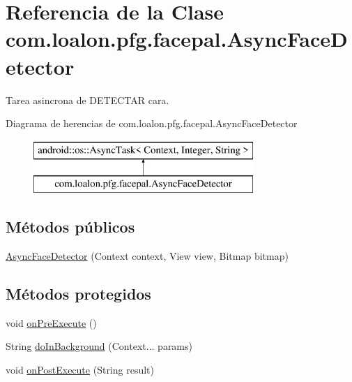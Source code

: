 \hypertarget{classcom_1_1loalon_1_1pfg_1_1facepal_1_1_async_face_detector}{}\section{Referencia de la Clase com.\+loalon.\+pfg.\+facepal.\+Async\+Face\+Detector}
\label{classcom_1_1loalon_1_1pfg_1_1facepal_1_1_async_face_detector}


Tarea asincrona de D\+E\+T\+E\+C\+T\+AR cara.  


Diagrama de herencias de com.\+loalon.\+pfg.\+facepal.\+Async\+Face\+Detector\begin{figure}[H]
\begin{center}
\leavevmode
\includegraphics[height=2.000000cm]{classcom_1_1loalon_1_1pfg_1_1facepal_1_1_async_face_detector}
\end{center}
\end{figure}
\subsection*{Métodos públicos}
\begin{DoxyCompactItemize}
\item 
\mbox{\hyperlink{classcom_1_1loalon_1_1pfg_1_1facepal_1_1_async_face_detector_a80b8c1b69a8f4a0b3855d9e289626079}{Async\+Face\+Detector}} (Context context, View view, Bitmap bitmap)
\end{DoxyCompactItemize}
\subsection*{Métodos protegidos}
\begin{DoxyCompactItemize}
\item 
void \mbox{\hyperlink{classcom_1_1loalon_1_1pfg_1_1facepal_1_1_async_face_detector_a69b608adca8119418bfce881d9f4c8de}{on\+Pre\+Execute}} ()
\item 
String \mbox{\hyperlink{classcom_1_1loalon_1_1pfg_1_1facepal_1_1_async_face_detector_ad9f3deb7c59c258ea2b13d7f79699232}{do\+In\+Background}} (Context... params)
\item 
void \mbox{\hyperlink{classcom_1_1loalon_1_1pfg_1_1facepal_1_1_async_face_detector_abb6b2781e8c7e0bf0d20ad2ea299bc0f}{on\+Post\+Execute}} (String result)
\end{DoxyCompactItemize}



